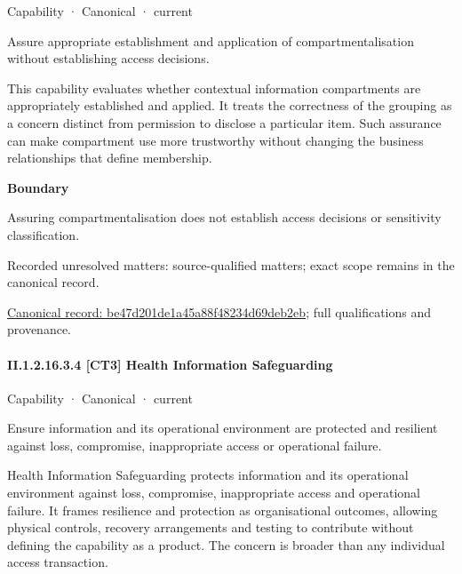 \label{element:be47d201de1a45a88f48234d69deb2eb}
{\small Capability · Canonical · current}\par

Assure appropriate establishment and application of compartmentalisation without establishing access decisions.



This capability evaluates whether contextual information compartments are appropriately established and applied. It treats the correctness of the grouping as a concern distinct from permission to disclose a particular item. Such assurance can make compartment use more trustworthy without changing the business relationships that define membership.



\textbf{Boundary}



Assuring compartmentalisation does not establish access decisions or sensitivity classification.


{\small Recorded unresolved matters: source-qualified matters; exact scope remains in the canonical record.}\par
{\footnotesize \href{../../../../../../../continuum/strategy/capability/be47d201de1a45a88f48234d69deb2eb.md}{Canonical record: be47d201de1a45a88f48234d69deb2eb}; full qualifications and provenance.}\par
\paragraph*{II.1.2.16.3.4 [CT3] Health Information Safeguarding}
\label{navigation:II.1.2.16.3.4}

\label{element:6e89db75de5b4c4c9274f78c8d9e665a}
{\small Capability · Canonical · current}\par

Ensure information and its operational environment are protected and resilient against loss, compromise, inappropriate access or operational failure.



Health Information Safeguarding protects information and its operational environment against loss, compromise, inappropriate access and operational failure. It frames resilience and protection as organisational outcomes, allowing physical controls, recovery arrangements and testing to contribute without defining the capability as a product. The concern is broader than any individual access transaction.



